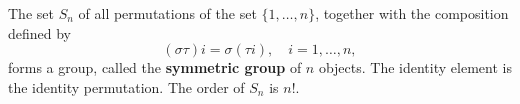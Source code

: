 The set $S_n$ of all permutations of the set $\{1, \ldots, n\}$, together with the composition defined by
$$(\sigma \tau)i = \sigma(\tau i), \quad i = 1, \ldots, n,$$
forms a group, called the \textbf{symmetric group} of $n$ objects. The identity element is the identity permutation. The order of $S_n$ is $n!$.
